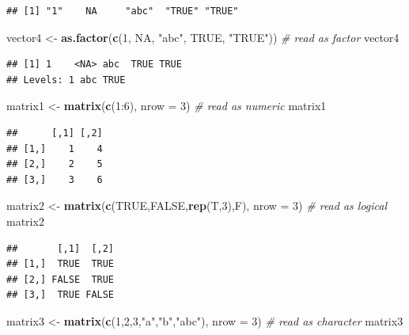 \documentclass[]{book}
\newenvironment{Shaded}{\begin{snugshade}}{\end{snugshade}}
\newcommand{\KeywordTok}[1]{\textcolor[rgb]{0.13,0.29,0.53}{\textbf{{#1}}}}
\newcommand{\DataTypeTok}[1]{\textcolor[rgb]{0.13,0.29,0.53}{{#1}}}
\newcommand{\DecValTok}[1]{\textcolor[rgb]{0.00,0.00,0.81}{{#1}}}
\newcommand{\StringTok}[1]{\textcolor[rgb]{0.31,0.60,0.02}{{#1}}}
\newcommand{\CommentTok}[1]{\textcolor[rgb]{0.56,0.35,0.01}{\textit{{#1}}}}
\newcommand{\OtherTok}[1]{\textcolor[rgb]{0.56,0.35,0.01}{{#1}}}
\newcommand{\NormalTok}[1]{{#1}}
\theoremstyle{definition}
\theoremstyle{definition}
\theoremstyle{remark}
\begin{document}
\begin{verbatim}
## [1] "1"    NA     "abc"  "TRUE" "TRUE"
\end{verbatim}

\begin{Shaded}
\begin{Highlighting}[]
\NormalTok{vector4 <-}\StringTok{ }\KeywordTok{as.factor}\NormalTok{(}\KeywordTok{c}\NormalTok{(}\DecValTok{1}\NormalTok{, }\OtherTok{NA}\NormalTok{, }\StringTok{"abc"}\NormalTok{, }\OtherTok{TRUE}\NormalTok{, }\StringTok{"TRUE"}\NormalTok{)) }\CommentTok{# read as factor }
\NormalTok{vector4}
\end{Highlighting}
\end{Shaded}

\begin{verbatim}
## [1] 1    <NA> abc  TRUE TRUE
## Levels: 1 abc TRUE
\end{verbatim}

\begin{Shaded}
\begin{Highlighting}[]
\NormalTok{matrix1 <-}\StringTok{ }\KeywordTok{matrix}\NormalTok{(}\KeywordTok{c}\NormalTok{(}\DecValTok{1}\NormalTok{:}\DecValTok{6}\NormalTok{), }\DataTypeTok{nrow =} \DecValTok{3}\NormalTok{) }\CommentTok{# read as numeric}
\NormalTok{matrix1}
\end{Highlighting}
\end{Shaded}

\begin{verbatim}
##      [,1] [,2]
## [1,]    1    4
## [2,]    2    5
## [3,]    3    6
\end{verbatim}

\begin{Shaded}
\begin{Highlighting}[]
\NormalTok{matrix2 <-}\StringTok{ }\KeywordTok{matrix}\NormalTok{(}\KeywordTok{c}\NormalTok{(}\OtherTok{TRUE}\NormalTok{,}\OtherTok{FALSE}\NormalTok{,}\KeywordTok{rep}\NormalTok{(T,}\DecValTok{3}\NormalTok{),F), }\DataTypeTok{nrow =} \DecValTok{3}\NormalTok{)  }\CommentTok{# read as logical}
\NormalTok{matrix2}
\end{Highlighting}
\end{Shaded}

\begin{verbatim}
##       [,1]  [,2]
## [1,]  TRUE  TRUE
## [2,] FALSE  TRUE
## [3,]  TRUE FALSE
\end{verbatim}

\begin{Shaded}
\begin{Highlighting}[]
\NormalTok{matrix3 <-}\StringTok{ }\KeywordTok{matrix}\NormalTok{(}\KeywordTok{c}\NormalTok{(}\DecValTok{1}\NormalTok{,}\DecValTok{2}\NormalTok{,}\DecValTok{3}\NormalTok{,}\StringTok{"a"}\NormalTok{,}\StringTok{"b"}\NormalTok{,}\StringTok{"abc"}\NormalTok{), }\DataTypeTok{nrow =} \DecValTok{3}\NormalTok{) }\CommentTok{# read as character}
\NormalTok{matrix3}
\end{Highlighting}
\end{Shaded}
\end{document}
